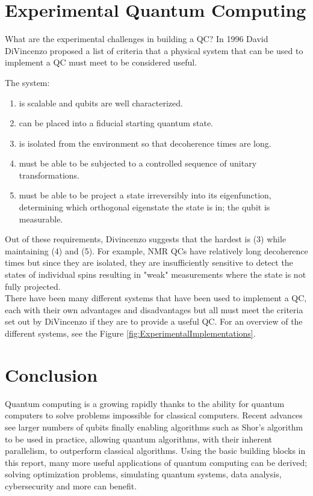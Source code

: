 \documentclass[reqno]{amsart}
\numberwithin{equation}{section}
\numberwithin{figure}{section}
\begin{document}
\section{Experimental Quantum Computing}
\begin{justify}
What are the experimental challenges in building a QC? In 1996 David DiVincenzo proposed a list of criteria that a physical system that can be used to implement a QC must meet to be considered useful. \cite{DiVincenzo1996}

The system:
    \begin{enumerate}
        \item is scalable and qubits are well characterized.
        \item can be placed into a fiducial starting quantum state.
        \item is isolated from the environment so that decoherence times are long.
        \item must be able to be subjected to a controlled sequence of unitary transformations.
        \item must be able to be project a state irreversibly into its eigenfunction, determining which orthogonal eigenstate the state is in; the qubit is measurable.
    \end{enumerate}

    Out of these requirements, Divincenzo suggests that the hardest is (3) while maintaining (4) and (5). For example, NMR QCs have relatively long decoherence times \cite{Bloembergen1948} but since they are isolated, they are insufficiently sensitive to detect the states of individual spins resulting in "weak" measurements where the state is not fully projected. \cite{CoryFahmyHavel1997} \\

There have been many different systems that have been used to implement a QC, each with their own advantages and disadvantages but all must meet the criteria set out by DiVincenzo if they are to provide a useful QC. For an overview of the different systems, see the Figure \ref{fig:ExperimentalImplementations}.
\end{justify}
\section{Conclusion}
\begin{justify}
    Quantum computing is a growing rapidly thanks to the ability for quantum computers to solve problems impossible for classical computers. Recent advances see larger numbers of qubits finally enabling algorithms such as Shor's algorithm to be used in practice, allowing quantum algorithms, with their inherent parallelism, to outperform classical algorithms. Using the basic building blocks in this report, many more useful applications of quantum computing can be derived; solving optimization problems, simulating quantum systems, data analysis, cybersecurity and more can benefit. \\
\end{justify}
\newpage
\appendix
\end{document}
